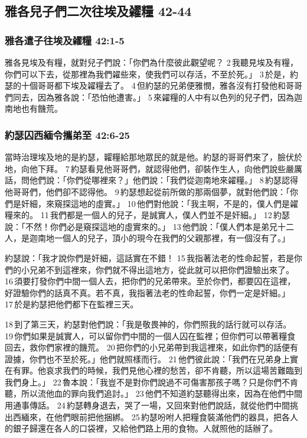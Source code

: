 \subsection{雅各兒子們二次往埃及糴糧 42-44} 
\subsubsection{雅各遣子往埃及糴糧 42:1-5} 
雅各見埃及有糧，就對兒子們說：「你們為什麼彼此觀望呢？ 2 我聽見埃及有糧，你們可以下去，從那裡為我們糴些來，使我們可以存活，不至於死。」 3 於是，約瑟的十個哥哥都下埃及糴糧去了。 4 但約瑟的兄弟便雅憫，雅各沒有打發他和哥哥們同去，因為雅各說：「恐怕他遭害。」 5 來糴糧的人中有以色列的兒子們，因為迦南地也有饑荒。

\subsubsection{約瑟囚西緬令攜弟至 42:6-25} 
當時治理埃及地的是約瑟，糶糧給那地眾民的就是他。約瑟的哥哥們來了，臉伏於地，向他下拜。 7 約瑟看見他哥哥們，就認得他們，卻裝作生人，向他們說些嚴厲話，問他們說：「你們從哪裡來？」他們說：「我們從迦南地來糴糧。」 8 約瑟認得他哥哥們，他們卻不認得他。 9 約瑟想起從前所做的那兩個夢，就對他們說：「你們是奸細，來窺探這地的虛實。」 10 他們對他說：「我主啊，不是的，僕人們是糴糧來的。 11 我們都是一個人的兒子，是誠實人，僕人們並不是奸細。」 12 約瑟說：「不然！你們必是窺探這地的虛實來的。」 13 他們說：「僕人們本是弟兄十二人，是迦南地一個人的兒子，頂小的現今在我們的父親那裡，有一個沒有了。」

約瑟說：「我才說你們是奸細，這話實在不錯！ 15 我指著法老的性命起誓，若是你們的小兄弟不到這裡來，你們就不得出這地方，從此就可以把你們證驗出來了。 16 須要打發你們中間一個人去，把你們的兄弟帶來。至於你們，都要囚在這裡，好證驗你們的話真不真。若不真，我指著法老的性命起誓，你們一定是奸細。」 17 於是約瑟把他們都下在監裡三天。

18 到了第三天，約瑟對他們說：「我是敬畏神的，你們照我的話行就可以存活。 19 你們如果是誠實人，可以留你們中間的一個人囚在監裡；但你們可以帶著糧食回去，救你們家裡的饑荒。 20 把你們的小兄弟帶到我這裡來，如此你們的話便有證據，你們也不至於死。」他們就照樣而行。 21 他們彼此說：「我們在兄弟身上實在有罪。他哀求我們的時候，我們見他心裡的愁苦，卻不肯聽，所以這場苦難臨到我們身上。」 22 魯本說：「我豈不是對你們說過不可傷害那孩子嗎？只是你們不肯聽，所以流他血的罪向我們追討。」 23 他們不知道約瑟聽得出來，因為在他們中間用通事傳話。 24 約瑟轉身退去，哭了一場，又回來對他們說話，就從他們中間挑出西緬來，在他們眼前把他捆綁。 25 約瑟吩咐人把糧食裝滿他們的器具，把各人的銀子歸還在各人的口袋裡，又給他們路上用的食物。人就照他的話辦了。

